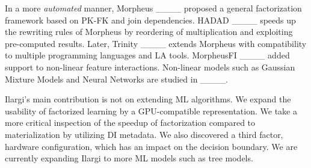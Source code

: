 In a more \emph{automated} manner, 
Morpheus ____ proposed a general factorization framework based on PK-FK and join dependencies. HADAD ____ speeds up the rewriting rules of  Morpheus by reordering of multiplication and exploiting pre-computed results. 
Later, Trinity ____ extends Morpheus with compatibility to 
multiple programming languages and LA tools. 
MorpheusFI ____ added support to non-linear feature interactions. Non-linear models such as 
Gaussian Mixture Models and Neural Networks are studied in ____.

Ilargi's main contribution is not on extending ML algorithms. We expand the usability of factorized learning by a GPU-compatible representation. We take a more critical inspection of the speedup of factorization compared to materialization by utilizing DI metadata. We also discovered a third factor, hardware configuration, which has an impact on the decision boundary. We are currently expanding Ilargi to more ML models such as tree models.



 

